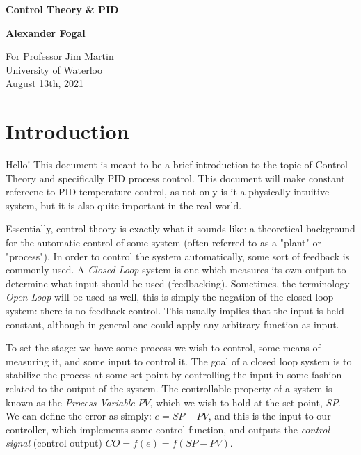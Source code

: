 \documentclass[11pt, letterpaper]{article}
\begin{document}
\begin{titlepage}
    \begin{center}
        \vspace*{1cm}

        \Huge
        \textbf{Control Theory \& PID}

        \vspace{0.5cm}
        \LARGE

        \vspace{1.5cm}

        \textbf{Alexander Fogal}

        \vspace{7.8cm}

        \Large
        For Professor Jim Martin\\
        University of Waterloo\\
        August 13th, 2021

    \end{center}
\end{titlepage}

\tableofcontents

\newpage

\section{Introduction}

Hello! This document is meant to be a brief introduction to the topic of Control Theory and specifically PID process control. This document will make constant referecne to PID temperature control, as not only is it a physically intuitive system, but it is also quite important in the real world. 

Essentially, control theory is exactly what it sounds like: a theoretical background for the automatic control of some system (often referred to as a "plant" or "process"). In order to control the system automatically, some sort of feedback is commonly used. A {\it Closed Loop } system is one which measures its own output to determine what input should be used (feedbacking). Sometimes, the terminology {\it Open Loop} will be used as well, this is simply the negation of the closed loop system: there is no feedback control. This usually implies that the input is held constant, although in general one could apply any arbitrary function as input. 

To set the stage: we have some process we wish to control, some means of measuring it, and some input to control it. The goal of a closed loop system is to stabilize the process at some set point by controlling the input in some fashion related to the output of the system. The controllable property of a system is known as the {\it Process Variable} $PV$, which we wish to hold at the set point, $SP$. We can define the error as simply: $e=SP-PV$, and this is the input to our controller, which implements some control function, and outputs the {\it control signal} (control output) $CO=f(e)=f(SP-PV)$. 
\end{document}
